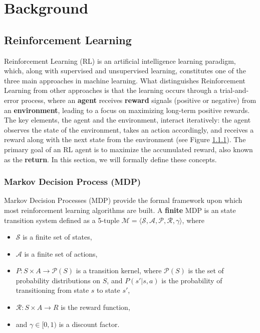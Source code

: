 
\chapter{Background}

\section{Reinforcement Learning}

Reinforcement Learning (RL) \cite{sutton2018reinforcement} is an artificial intelligence learning paradigm, which, along with supervised and unsupervised learning, constitutes one of the three main approaches in machine learning. What distinguishes Reinforcement Learning from other approaches is that the learning occurs through a trial-and-error process, where an \textbf{agent} receives \textbf{reward} signals (positive or negative) from an \textbf{environment}, leading to a focus on maximizing long-term positive rewards. The key elements, the agent and the environment, interact iteratively: the agent observes the state of the environment, takes an action accordingly, and receives a reward along with the next state from the environment (see Figure \ref{}). The primary goal of an RL agent is to maximize the accumulated reward, also known as the \textbf{return}. In this section, we will formally define these concepts.

\subsection{Markov Decision Process (MDP)}

Markov Decision Processes (MDP) provide the formal framework upon which most reinforcement learning algorithms are built. A \textbf{finite} MDP is an state transition system defined as a 5-tuple $\mathcal{M} = \langle \mathcal{S}, \mathcal{A}, \mathcal{P}, \mathcal{R}, \gamma \rangle$, where 

\begin{itemize}
    \item $\mathcal{S}$ is a finite set of states,
    \item $\mathcal{A}$ is a finite set of actions,
    \item $P : S \times A \rightarrow \mathcal{P}(S)$ is a transition kernel, where $\mathcal{P}(S)$ is the set of probability distributions on $S$, and $P(s'|s, a)$ is the probability of transitioning from state $s$ to state $s'$,
    \item $\mathcal{R} : S \times A \rightarrow R$ is the reward function,
    \item and $\gamma \in [0, 1)$ is a discount factor.
\end{itemize}

